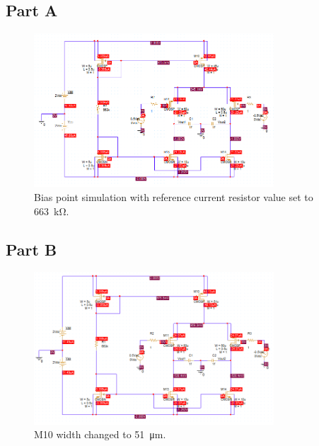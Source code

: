 \documentclass{article}
\newcommand \imgWidthFactor{0.8}
\begin{document}
	\subsection{Part A}

		\begin{figure}[H]
			\centering
			\includegraphics[width=\imgWidthFactor\textwidth]{a1}
			\caption{Bias point simulation with reference current resistor value set to \SI{663}{\kohm}.}
		\end{figure}

	\subsection{Part B}

		\begin{figure}[H]
			\centering
			\includegraphics[width=\imgWidthFactor\textwidth]{b1}
			\caption{M10 width changed to \SI{51}{\um}.}
		\end{figure}
\end{document}
